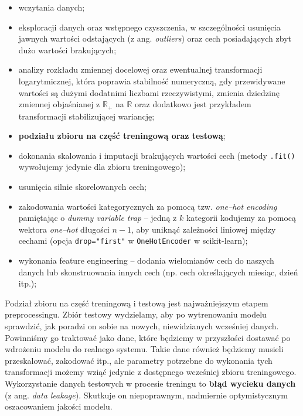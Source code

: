 \documentclass{myclass}
\numberwithin{equation}{subsection}
\begin{document}
\begin{itemize}
   
    \item wczytania danych;
    
    \item eksploracji danych oraz wstępnego czyszczenia, w szczególności usunięcia jawnych wartości
    odstających (z ang. \textit{outliers}) oraz cech posiadających zbyt dużo wartości brakujących;

    \item analizy rozkładu zmiennej docelowej oraz ewentualnej transformacji logarytmicznej, która
    poprawia stabilność numeryczną, gdy przewidywane wartości są dużymi dodatnimi liczbami
    rzeczywistymi, zmienia dziedzinę zmiennej objaśnianej z \(\mathbb{R}_+\) na \(\mathbb{R}\) oraz
    dodatkowo jest przykładem transformacji stabilizującej wariancję;
    
    \item \textbf{podziału zbioru na część treningową oraz testową};

    \item dokonania skalowania i imputacji brakujących wartości cech (metody \texttt{.fit()}
    wywołujemy jedynie dla zbioru treningowego);

    \item usunięcia silnie skorelowanych cech;

    \item zakodowania wartości kategorycznych za pomocą tzw. \textit{one--hot encoding} pamiętając o
    \textit{dummy variable trap} -- jedną z \(k\) kategorii kodujemy za pomocą wektora
    \textit{one--hot} długości \(n-1\), aby uniknąć zależności liniowej między cechami (opcja
    \texttt{drop="first"} w \texttt{OneHotEncoder} w scikit-learn);

    \item wykonania feature engineering -- dodania wielomianów cech do naszych danych lub
    skonstruowania innych cech (np. cech określających miesiąc, dzień itp.);

\end{itemize}

Podział zbioru na część treningową i testową jest najważniejszym etapem preprocessingu. Zbiór
testowy wydzielamy, aby po wytrenowaniu modelu sprawdzić, jak poradzi on sobie na nowych,
niewidzianych wcześniej danych. Powinniśmy go traktować jako dane, które będziemy w przyszłości
dostawać po wdrożeniu modelu do realnego systemu. Takie dane również będziemy musieli przeskalować,
zakodować itp., ale parametry potrzebne do wykonania tych transformacji możemy wziąć jedynie z
dostępnego wcześniej zbioru treningowego. Wykorzystanie danych testowych w procesie treningu to
\textbf{błąd wycieku danych} (z ang. \textit{data leakage}). Skutkuje on niepoprawnym, nadmiernie
optymistycznym oszacowaniem jakości modelu.
\end{document}
